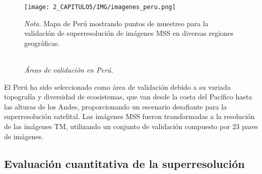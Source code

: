             \begin{figure}[H] 
                \caption{\doublespacing \\ \textit{Áreas de validación en Perú.}} 
                \centering
                \texttt{[image: 2\_CAPITULO5/IMG/imagenes\_peru.png]}
                \label{imagenes_peru}
                \begin{justify}
                    \textit{Nota.} Mapa de Perú mostrando puntos de muestreo para la validación de superresolución de imágenes MSS en diversas regiones geográficas.
                \end{justify}                    
                \label{modelo3}
            \end{figure}

            El Perú ha sido seleccionado como área de validación debido a su variada topografía y diversidad de ecosistemas, que van desde la costa del Pacífico hasta las alturas de los Andes, proporcionando un escenario desafiante para la superresolución satelital. Las imágenes MSS fueron transformadas a la resolución de las imágenes TM, utilizando un conjunto de validación compuesto por 23 pares de imágenes.
            
        \subsection{Evaluación cuantitativa de la superresolución}

